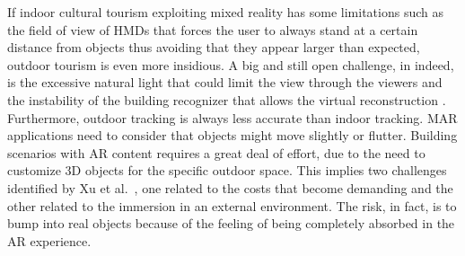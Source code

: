 If indoor cultural tourism exploiting mixed reality has some limitations such as the field of view of HMDs that forces the user to always stand at a certain distance from objects thus avoiding that they appear larger than expected, outdoor tourism is even more insidious. A big and still open challenge, in indeed, is the excessive natural light that could limit the view through the viewers and the instability of the building recognizer that allows the virtual reconstruction \cite{debandi_enhancing_2018}. Furthermore, outdoor tracking is always less accurate than indoor tracking. MAR applications need to consider that objects might move slightly or flutter. Building scenarios with AR content requires a great deal of effort, due to the need to customize 3D objects for the specific outdoor space. This implies two challenges identified by Xu et al.~\cite{xu_exploring_2018}, one related to the costs that become demanding and the other related to the immersion in an external environment. The risk, in fact, is to bump into real objects because of the feeling of being completely absorbed in the AR experience.
\\

